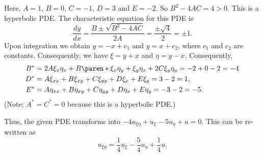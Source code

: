 \documentclass[11pt]{penrose}
\begin{document}
\begin{problem}{3}
    
    Here, $A = 1$, $B = 0$, $C = -1$, $D = 3$ and $E = -2$. So $B^2 - 4AC = 4 > 0$. This is a hyperbolic PDE. The characteristic equation for this PDE is
    \begin{equation*}
        \frac{dy}{dx} = \frac{B \pm \sqrt{B^2 - 4AC}}{2A} = \frac{\pm \sqrt{4}}{2} = \pm 1.
    \end{equation*}
    Upon integration we obtain $y = - x + c_1$ and $y = x + c_2$, where $c_1$ and $c_2$ are constants. Consequently, we have $\xi = y + x$ and $\eta = y - x$. Consequently,
    \begin{align*}
        B^{*} &= 2A\xi_x \eta_x + B \paren*{\xi_x \eta_y + \xi_y \eta_x} + 2C \xi_y \eta_y = -2 + 0 - 2 = -4\\
        D^{*} &= A \xi_{xx} + B \xi_{xy} + C \xi_{yy} + D \xi_{x} + E \xi_{y} = 3-2 = 1,\\
        E^{*} &= A \eta_{xx} + B \eta_{xy} + C \eta_{yy} + D \eta_{x} + E \eta_{y} = -3-2 = -5.
    \end{align*}
    (Note: $A^* = C^* = 0$ because this is a hyperbolic PDE.)

    Thus, the given PDE transforms into $-4 u_{\xi\eta} + u_{\xi} -5 u_{\eta} + u = 0$. This can be re-written as
    \begin{equation*}
        u_{\xi\eta} = \frac{1}{4} u_{\xi} - \frac{5}{4} u_{\eta} + \frac{1}{4} u.
    \end{equation*}
\end{problem}
\end{document}

